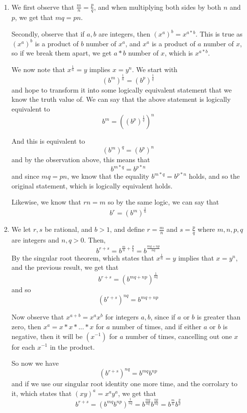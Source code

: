 \documentclass{article}
\begin{document}
\begin{solution}
\

\begin{enumerate}
    \item We first observe that $\frac{m}{n} = \frac{p}{q}$, and when multiplying both sides by both $n$ and $p$, we get that $mq = pn$. 

Secondly, observe that if $a,b$ are integers, then $(x^a)^b = x^{a*b}$. This is true as $(x^a)^b$ is a product of $b$ number of $x^a$, and $x^a$ is a product of $a$ number of $x$, so if we break them apart, we get $a*b$ number of $x$, which is $x^{a*b}$.

We now note that $x^\frac{1}{n} = y$ implies $x = y^n$. We start with $$(b^m)^\frac{1}{n} = (b^p)^\frac{1}{q}$$and hope to transform it into some logically equivalent statement that we know the truth value of. We can say that the above statement is logically equivalent to $$b^m = ((b^p)^\frac{1}{q})^n$$


And this is equivalent to $$(b^m)^q = (b^p)^n$$and by the observation above, this means that $$b^{m*q} = b^{p*n}$$and since $mq = pn$, we know that the equality $b^{m*q} = b^{p*n}$ holds, and so the original statement, which is logically equivalent holds.

Likewise, we know that $rn = m$ so by the same logic, we can say that $$b^r = (b^m)^\frac{1}{n}$$

\item We let $r,s$ be rational, and $b>1$, and define $r = \frac{m}{n}$ and $s = \frac{p}{q}$ where $m,n,p,q$ are integers and $n,q > 0$. Then, $$b^{r+s} = b^{\frac{m}{n} + \frac{p}{q}} = b^{\frac{mq+np}{nq}}$$By the singular root theorem, which states that $x^\frac{1}{n} = y$ implies that $x = y^n$, and the previous result, we get that $$b^{r+s} = (b^{mq+np})^\frac{1}{nq}$$and so$$(b^{r+s})^{nq} = b^{mq+np}$$

Now observe that $x^{a+b} = x^ax^b$ for integers $a,b$, since if $a$ or $b$ is greater than zero, then $x^a = x*x*...*x$ for $a$ number of times, and if either $a$ or $b$ is negative, then it will be $(x^{-1})$ for $a$ number of times, cancelling out one $x$ for each $x^{-1}$ in the product. 

So now we have $$(b^{r+s})^{nq} = b^{mq} b^{np}$$and if we use our singular root identity one more time, and the corrolary to it, which states that $(xy)^a = x^ay^a$, we get that $$b^{r+s} = (b^{mq}b^{np})^\frac{1}{nq} = b^\frac{mq}{nq} b^\frac{np}{nq} = b^\frac{m}{n} b^\frac{p}{q}$$


\end{enumerate}
\end{solution}
\end{document}
